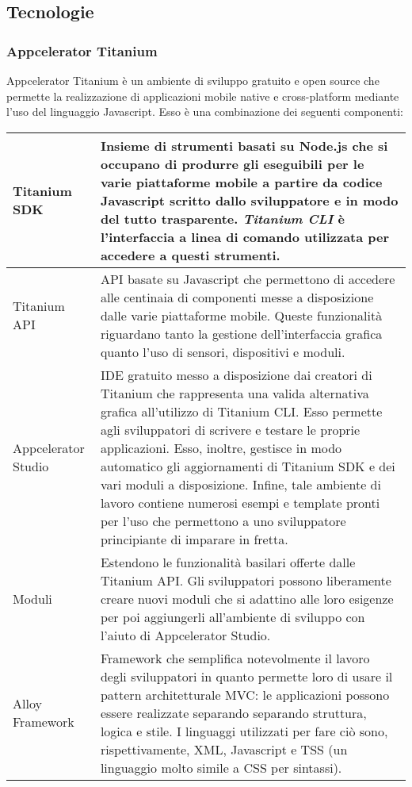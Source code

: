 		\subsection{Tecnologie}
			\subsubsection{Appcelerator Titanium}
				Appcelerator Titanium è un ambiente di sviluppo gratuito e open source che permette la realizzazione di applicazioni
				mobile native e cross-platform mediante l'uso del linguaggio Javascript.
				Esso è una combinazione dei seguenti componenti:
				\begin{center}
					\begin{tabular}[H]{p{} p{}}
						Titanium SDK 			& Insieme di strumenti basati su Node.js che si occupano di produrre
										  gli eseguibili per le varie piattaforme mobile a partire da codice
										  Javascript scritto dallo sviluppatore e in modo del tutto
										  trasparente. \emph{Titanium CLI} è l'interfaccia a linea di
										  comando utilizzata per accedere a questi strumenti.\\
						\hline
						Titanium API			& API basate su Javascript che permettono di accedere alle centinaia
										  di componenti	messe a disposizione dalle varie piattaforme mobile.
										  Queste funzionalità riguardano tanto la gestione dell'interfaccia
										  grafica quanto l'uso di sensori, dispositivi e moduli.\\
						\hline
						Appcelerator Studio		& IDE gratuito messo a disposizione dai creatori di Titanium che
										  rappresenta una valida alternativa grafica all'utilizzo di 
										  Titanium CLI. Esso permette agli sviluppatori di scrivere e 
										  testare le proprie applicazioni. Esso, inoltre, gestisce in modo
										  automatico gli aggiornamenti di Titanium SDK e dei vari moduli a
										  disposizione. Infine, tale ambiente di lavoro contiene numerosi
										  esempi e template pronti per l'uso che permettono a uno
										  sviluppatore principiante di imparare in fretta.\\
						\hline
						Moduli				& Estendono le funzionalità basilari offerte dalle Titanium API. Gli
										  sviluppatori possono liberamente creare nuovi moduli che si
										  adattino alle loro esigenze per poi aggiungerli all'ambiente di
										  sviluppo con l'aiuto di Appcelerator Studio.\\
						\hline
						Alloy Framework			& Framework che semplifica notevolmente il lavoro degli sviluppatori
										  in quanto permette loro di usare il pattern architetturale MVC: le
										  applicazioni possono essere realizzate separando separando
										  struttura, logica e stile. I linguaggi utilizzati per fare ciò
										  sono, rispettivamente, XML, Javascript e TSS (un linguaggio molto
										  simile a CSS per sintassi).\\
					\end{tabular}
				\end{center}
